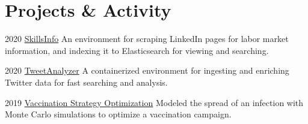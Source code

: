 \documentclass{tccv}
\begin{document}
\begin{eventlist}
%

\end{eventlist}
\vspace{-12pt}
\section{Projects \& Activity}
\begin{yearlist}
	\item  {2020}
	{\href{https://github.com/markditsworth/SkillsInfo}{SkillsInfo}}
	{An environment for scraping LinkedIn pages for labor market information, and indexing it to Elasticsearch for viewing and searching.}
	
	\item {2020}
	{\href{https://github.com/markditsworth/TweetAnalyzer}{TweetAnalyzer}}
	{A containerized environment for ingesting and enriching Twitter data for fast searching and analysis.}
	
	
	
	
	
	\item{2019}
	{\href{https://towardsdatascience.com/infection-modeling-part-1-87e74645568a}{Vaccination Strategy Optimization}}
	{Modeled the spread of an infection with Monte Carlo simulations to optimize a vaccination campaign.}
	

\end{yearlist}
\end{document}
